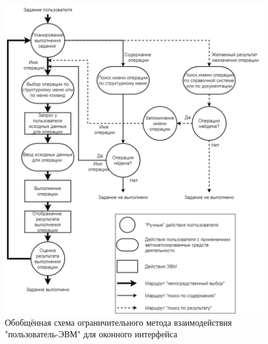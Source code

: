 \begin{figure}[!ht]
  \centering
  \includegraphics[scale=0.35]{ResearchNotes/rndhpc_not_gui_2022_10_10/scheme1.png}
  \caption{Обобщённая схема ограничительного метода взаимодействия "пользователь-ЭВМ" для оконного интерфейса}
  \label{scheme1}
\end{figure}

